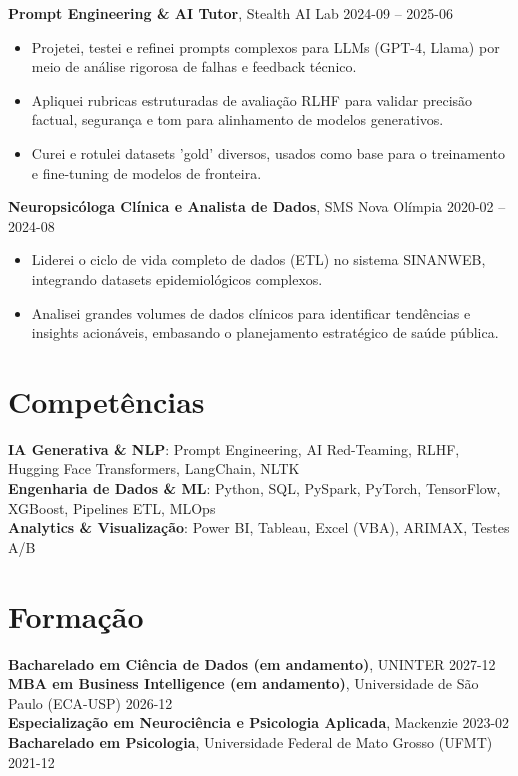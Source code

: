 \documentclass[10pt,a4paper]{article}
\begin{document}
\textbf{Prompt Engineering \& AI Tutor}, Stealth AI Lab \hfill 2024-09 -- 2025-06\\
\begin{itemize}
  \item Projetei, testei e refinei prompts complexos para LLMs (GPT-4, Llama) por meio de análise rigorosa de falhas e feedback técnico.
  \item Apliquei rubricas estruturadas de avaliação RLHF para validar precisão factual, segurança e tom para alinhamento de modelos generativos.
  \item Curei e rotulei datasets 'gold' diversos, usados como base para o treinamento e fine-tuning de modelos de fronteira.
\end{itemize}

\textbf{Neuropsicóloga Clínica e Analista de Dados}, SMS Nova Olímpia \hfill 2020-02 -- 2024-08\\
\begin{itemize}
  \item Liderei o ciclo de vida completo de dados (ETL) no sistema SINANWEB, integrando datasets epidemiológicos complexos.
  \item Analisei grandes volumes de dados clínicos para identificar tendências e insights acionáveis, embasando o planejamento estratégico de saúde pública.
\end{itemize}

\section*{Competências}

\textbf{IA Generativa \& NLP}: Prompt Engineering, AI Red-Teaming, RLHF, Hugging Face Transformers, LangChain, NLTK\\
\textbf{Engenharia de Dados \& ML}: Python, SQL, PySpark, PyTorch, TensorFlow, XGBoost, Pipelines ETL, MLOps\\
\textbf{Analytics \& Visualização}: Power BI, Tableau, Excel (VBA), ARIMAX, Testes A/B\\

\section*{Formação}

\textbf{Bacharelado em Ciência de Dados (em andamento)}, UNINTER \hfill 2027-12\\
\textbf{MBA em Business Intelligence (em andamento)}, Universidade de São Paulo (ECA-USP) \hfill 2026-12\\
\textbf{Especialização em Neurociência e Psicologia Aplicada}, Mackenzie \hfill 2023-02\\
\textbf{Bacharelado em Psicologia}, Universidade Federal de Mato Grosso (UFMT) \hfill 2021-12\\
\end{document}
